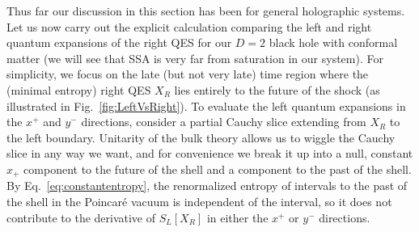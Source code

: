\documentclass[12pt]{article}
\renewcommand{\ln}{\log}
\begin{document}

Thus far our discussion in this section has been for general holographic systems. Let us now carry out the explicit calculation comparing the left and right quantum expansions of the right QES for our $D=2$ black hole with conformal matter (we will see that SSA is very far from saturation in our system). For simplicity, we focus on the late (but not very late) time region where the (minimal entropy) right QES $X_{R}$ lies entirely to the future of the shock (as illustrated in Fig.~\ref{fig:LeftVsRight}). To evaluate the left quantum expansions in the $x^{+}$ and $y^{-}$ directions, consider a partial Cauchy slice extending from $X_{R}$ to the left boundary. Unitarity of the bulk theory allows us to wiggle the Cauchy slice in any way we want, and for convenience we break it up into a null, constant $x_{+}$ component to the future of the shell and a component to the past of the shell. By Eq.~\ref{eq:constantentropy}, the renormalized entropy of intervals to the past of the shell in the Poincar\'e vacuum is independent of the interval, so it does not contribute to the derivative of $S_{L}[X_{R}]$ in either the $x^{+}$ or $y^{-}$ directions.
\end{document}
